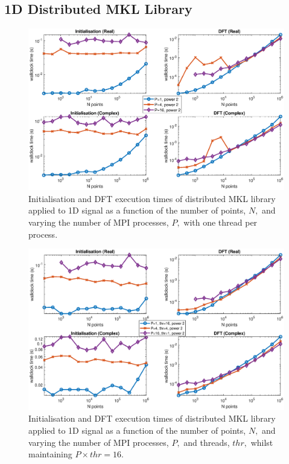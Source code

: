 \documentclass[a4paper]{article}
\begin{document}
\subsection{1D Distributed MKL Library}\label{Sec:1DDistMKL}

\begin{figure}[htb]
    \centering
    \includegraphics[width=\linewidth]{../results/mkl_1d_mpi.eps}
  \caption{Initialisation and DFT execution times of distributed MKL library applied to 1D signal as a function of the
    number of points, $N,$ and varying the number of MPI processes, $P,$ with one thread per process.}
  \label{1DDistMKL}
\end{figure}

\begin{figure}[htb]
    \centering
    \includegraphics[width=\linewidth]{../results/mkl_1d_mpi_thr.eps}
  \caption{Initialisation and DFT execution times of distributed MKL library applied to 1D signal as a function of the
    number of points, $N,$ and varying the number of MPI processes, $P,$ and threads, $thr,$ whilst maintaining $P\times thr=16.$}
  \label{1DDistMKL16}
\end{figure}
\end{document}
